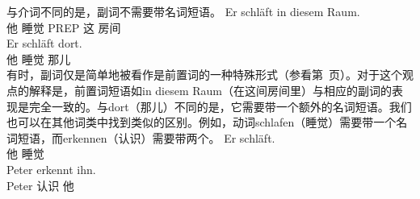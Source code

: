 与介词不同的是，副词不需要带名词短语。
\eal
\ex
\gll Er schläft in diesem Raum.\\
	 他 睡觉 PREP 这 房间\\
\ex
\gll Er schläft dort.\\
	 他 睡觉 那儿\\
\zl
有时，副词仅是简单地被看作是前置词的一种特殊形式（参看第~\pageref{Seite-Adverbien-PP}页）。对于这个观点的解释是，前置词短语如in diesem Raum（在这间房间里）与相应的副词的表现是完全一致的。与dort（那儿）不同的是，它需要带一个额外的名词短语。我们也可以在其他词类中找到类似的区别。例如，动词schlafen（睡觉）需要带一个名词短语，而erkennen（认识）需要带两个。
\eal
\ex 
\gll Er schläft.\\
     他 睡觉\\
\ex 
\gll Peter erkennt ihn.\\
     Peter 认识 他\\
\zl

